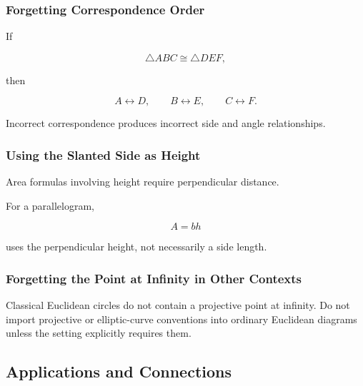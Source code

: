 \subsubsection{Forgetting Correspondence Order}

If

\[ \triangle ABC\cong\triangle DEF, \]

then

\[ A\leftrightarrow D,\qquad B\leftrightarrow E,\qquad C\leftrightarrow F. \]

Incorrect correspondence produces incorrect side and angle relationships.

\subsubsection{Using the Slanted Side as Height}

Area formulas involving height require perpendicular distance.

For a parallelogram,

\[ A=bh \]

uses the perpendicular height, not necessarily a side length.

\subsubsection{Forgetting the Point at Infinity in Other Contexts}

Classical Euclidean circles do not contain a projective point at infinity.
Do not import projective or elliptic-curve conventions into ordinary
Euclidean diagrams unless the setting explicitly requires them.

\subsection{Applications and Connections}
\label{subsec:euclidean-geometry-applications}

